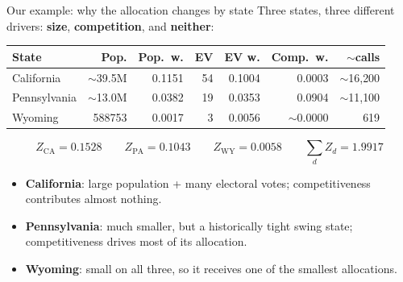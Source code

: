 \documentclass[aspectratio=169,11pt]{beamer}
\begin{document}
	\begin{frame}{Our example: why the allocation changes by state}
		Three states, three different drivers:
		\textbf{size}, \textbf{competition}, and \textbf{neither}:
		\vspace{0.3em}
		\begin{center}
			\small
			\begin{tabular}{l r r r r r r}
				\toprule
				\textbf{State} & \textbf{Pop.} & \textbf{Pop.\ w.}
				& \textbf{EV} & \textbf{EV w.} & \textbf{Comp.\ w.} & \textbf{$\sim$calls} \\
				\midrule
				California   & $\sim$39.5M & 0.1151 & 54 & 0.1004 & 0.0003 & $\sim$16{,}200 \\
				Pennsylvania & $\sim$13.0M & 0.0382 & 19 & 0.0353 & 0.0904 & $\sim$11{,}100 \\
				Wyoming      & \num{588753} & 0.0017 & 3 & 0.0056 & $\sim$0.0000 & 619 \\
				\bottomrule
			\end{tabular}
		\end{center}
		\vspace{0.2em}
		\[
		Z_{\text{CA}} = 0.1528 \qquad
		Z_{\text{PA}} = 0.1043 \qquad
		Z_{\text{WY}} = 0.0058 \qquad
		\textstyle\sum_d Z_d = 1.9917
		\]
		\begin{itemize}\small
			\item \textbf{California}: large population + many electoral votes;
			competitiveness contributes almost nothing.
			\item \textbf{Pennsylvania}: much smaller, but a historically tight
			swing state; competitiveness drives most of its allocation.
			\item \textbf{Wyoming}: small on all three, so it receives one of
			the smallest allocations.
		\end{itemize}
	\end{frame}
	
\end{document}
